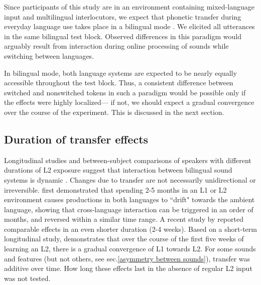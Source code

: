 \documentclass[12 pt]{article}
\begin{document}
Since participants of this study are in an environment containing mixed-language input and multilingual interlocutors, we expect that phonetic transfer during everyday language use takes place in a bilingual mode \citep[see][]{grosjean1998studying}. We elicited all utterances in the same bilingual test block. Observed differences in this paradigm would arguably result from interaction during online processing of sounds while switching between languages. 

In bilingual mode, both language systems are expected to be nearly equally accessible throughout the test block. Thus, a consistent difference between switched and nonswitched tokens in such a paradigm would be possible only if the effects were highly localized--- if not, we should expect a gradual convergence over the course of the experiment. This is discussed in the next section.


\subsection{Duration of transfer effects} \label{duration}

Longitudinal studies and between-subject comparisons of speakers with different durations of L2 exposure suggest that interaction between bilingual sound systems is dynamic \citep[e.g.][]{bohn1992production}. Changes due to transfer are not necessarily unidirectional or irreversible. \citet[][VOT]{sancier1997gestural} first demonstrated that spending 2-5 months in an L1 or L2 environment causes productions in both languages to ``drift" towards the ambient language, showing that cross-language interaction can be triggered in an order of months, and reversed within a similar time range. A recent study by \citet[][VOT]{tobin2017phonetic} reported comparable effects in an even shorter duration (2-4 weeks). Based on a short-term longitudinal study, \citet[][VOT]{chang2012rapid} demonstrates that over the course of the first five weeks of learning an L2, there is a gradual convergence of L1 towards L2. For some sounds and features (but not others, see sec.\ref{asymmetry between sounds}), transfer was additive over time. How long these effects last in the absence of regular L2 input was not tested. 
\end{document}
